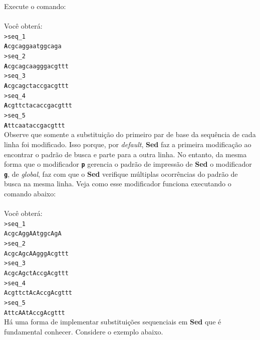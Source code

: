 \begin{refsection}
Execute o comando:\\
\\

Você obterá:\\
\texttt{>seq\_1}\\
\texttt{\textbf{A}cgcaggaatggcaga}\\
\texttt{>seq\_2}\\
\texttt{\textbf{A}cgcagcaagggacgttt}\\
\texttt{>seq\_3}\\
\texttt{\textbf{A}cgcagctaccgacgttt}\\
\texttt{>seq\_4}\\
\texttt{\textbf{A}cgttctacaccgacgttt}\\
\texttt{>seq\_5}\\
\texttt{\textbf{A}ttcaataccgacgttt}\\

Observe que somente a substituição do primeiro par de base da sequência de cada linha foi modificado. Isso porque, por \textit{default}, \textbf{Sed} faz a primeira modificação ao encontrar o padrão de busca e parte para a outra linha. No entanto, da mesma forma que o modificador \texttt{\textbf{p}} gerencia o padrão de impressão de \textbf{Sed} o modificador \texttt{\textbf{g}}, de \textit{global}, faz com que o \textbf{Sed} verifique múltiplas ocorrências do padrão de busca na mesma linha. Veja como esse modificador funciona executando o comando abaixo:\\

\\


Você obterá:\\
\texttt{>seq\_1}\\
\texttt{AcgcAggAAtggcAgA}\\
\texttt{>seq\_2}\\
\texttt{AcgcAgcAAgggAcgttt}\\
\texttt{>seq\_3}\\
\texttt{AcgcAgctAccgAcgttt}\\
\texttt{>seq\_4}\\
\texttt{AcgttctAcAccgAcgttt}\\
\texttt{>seq\_5}\\
\texttt{AttcAAtAccgAcgttt}\\

Há uma forma de implementar substituições sequenciais em \textbf{Sed} que é fundamental conhecer. Considere o exemplo abaixo.


\end{refsection}
